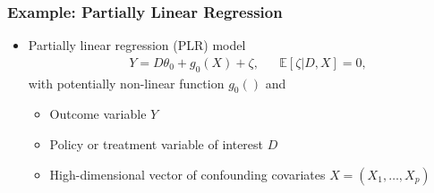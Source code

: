 \mode*

\begin{frame}
\frametitle{Example: Partially Linear Regression}

\begin{itemize}
\item Partially linear regression (PLR) model
\begin{align*}
&Y = D \theta_0 + g_0(X) + \zeta, & &\mathbb{E}[\zeta | D,X] = 0, 
\end{align*}
with potentially non-linear function $g_0()$ and
\begin{itemize}
\item Outcome variable $Y$
\item Policy or treatment variable of interest $D$
\item High-dimensional vector of confounding covariates $X = (X_1, \ldots, X_p)$
\end{itemize}
\end{itemize}
\end{frame}

